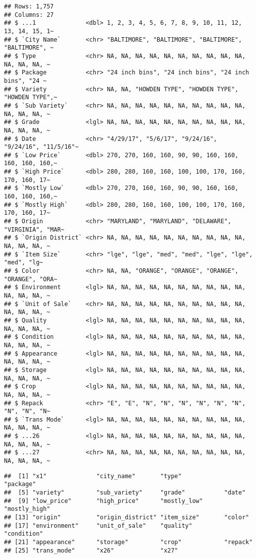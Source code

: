 \documentclass[
]{article}
\begin{document}
\begin{verbatim}
## Rows: 1,757
## Columns: 27
## $ ...1              <dbl> 1, 2, 3, 4, 5, 6, 7, 8, 9, 10, 11, 12, 13, 14, 15, 1~
## $ `City Name`       <chr> "BALTIMORE", "BALTIMORE", "BALTIMORE", "BALTIMORE", ~
## $ Type              <chr> NA, NA, NA, NA, NA, NA, NA, NA, NA, NA, NA, NA, NA, ~
## $ Package           <chr> "24 inch bins", "24 inch bins", "24 inch bins", "24 ~
## $ Variety           <chr> NA, NA, "HOWDEN TYPE", "HOWDEN TYPE", "HOWDEN TYPE",~
## $ `Sub Variety`     <chr> NA, NA, NA, NA, NA, NA, NA, NA, NA, NA, NA, NA, NA, ~
## $ Grade             <lgl> NA, NA, NA, NA, NA, NA, NA, NA, NA, NA, NA, NA, NA, ~
## $ Date              <chr> "4/29/17", "5/6/17", "9/24/16", "9/24/16", "11/5/16"~
## $ `Low Price`       <dbl> 270, 270, 160, 160, 90, 90, 160, 160, 160, 160, 160,~
## $ `High Price`      <dbl> 280, 280, 160, 160, 100, 100, 170, 160, 170, 160, 17~
## $ `Mostly Low`      <dbl> 270, 270, 160, 160, 90, 90, 160, 160, 160, 160, 160,~
## $ `Mostly High`     <dbl> 280, 280, 160, 160, 100, 100, 170, 160, 170, 160, 17~
## $ Origin            <chr> "MARYLAND", "MARYLAND", "DELAWARE", "VIRGINIA", "MAR~
## $ `Origin District` <chr> NA, NA, NA, NA, NA, NA, NA, NA, NA, NA, NA, NA, NA, ~
## $ `Item Size`       <chr> "lge", "lge", "med", "med", "lge", "lge", "med", "lg~
## $ Color             <chr> NA, NA, "ORANGE", "ORANGE", "ORANGE", "ORANGE", "ORA~
## $ Environment       <lgl> NA, NA, NA, NA, NA, NA, NA, NA, NA, NA, NA, NA, NA, ~
## $ `Unit of Sale`    <chr> NA, NA, NA, NA, NA, NA, NA, NA, NA, NA, NA, NA, NA, ~
## $ Quality           <lgl> NA, NA, NA, NA, NA, NA, NA, NA, NA, NA, NA, NA, NA, ~
## $ Condition         <lgl> NA, NA, NA, NA, NA, NA, NA, NA, NA, NA, NA, NA, NA, ~
## $ Appearance        <lgl> NA, NA, NA, NA, NA, NA, NA, NA, NA, NA, NA, NA, NA, ~
## $ Storage           <lgl> NA, NA, NA, NA, NA, NA, NA, NA, NA, NA, NA, NA, NA, ~
## $ Crop              <lgl> NA, NA, NA, NA, NA, NA, NA, NA, NA, NA, NA, NA, NA, ~
## $ Repack            <chr> "E", "E", "N", "N", "N", "N", "N", "N", "N", "N", "N~
## $ `Trans Mode`      <lgl> NA, NA, NA, NA, NA, NA, NA, NA, NA, NA, NA, NA, NA, ~
## $ ...26             <lgl> NA, NA, NA, NA, NA, NA, NA, NA, NA, NA, NA, NA, NA, ~
## $ ...27             <chr> NA, NA, NA, NA, NA, NA, NA, NA, NA, NA, NA, NA, NA, ~
\end{verbatim}

\begin{verbatim}
##  [1] "x1"              "city_name"       "type"            "package"        
##  [5] "variety"         "sub_variety"     "grade"           "date"           
##  [9] "low_price"       "high_price"      "mostly_low"      "mostly_high"    
## [13] "origin"          "origin_district" "item_size"       "color"          
## [17] "environment"     "unit_of_sale"    "quality"         "condition"      
## [21] "appearance"      "storage"         "crop"            "repack"         
## [25] "trans_mode"      "x26"             "x27"
\end{verbatim}
\end{document}
